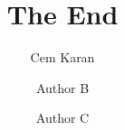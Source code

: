 \documentclass[
letter, %
11pt, %
onecolumn, %
openright, %
]{memoir}
\author{Cem Karan \and Author B \and Author C}
\title{The End}
\begin{document}
\frontmatter

\maketitle

\clearpage

\tableofcontents*
\clearpage



\mainmatter








\backmatter


% 
% 
\end{document}
